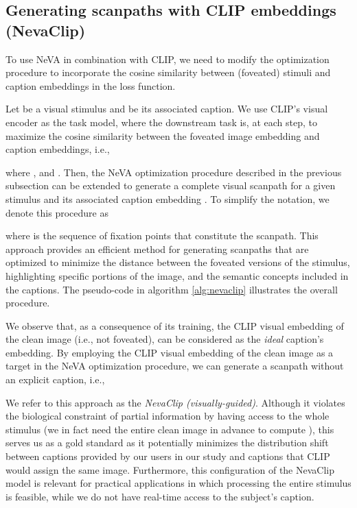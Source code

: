 \documentclass{article}
\begin{document}
\subsection{Generating scanpaths with CLIP embeddings (NevaClip)}
To use NeVA in combination with CLIP, we need to modify the optimization procedure to incorporate the cosine similarity between (foveated) stimuli and caption embeddings in the loss function. 

Let  be a visual stimulus and  be its associated caption. We use CLIP's visual encoder  as the task model, where the downstream task is, at each step, to maximize the cosine similarity between the foveated image embedding and caption embeddings, i.e., 

where , and .
Then, the NeVA optimization procedure described in the previous subsection can be extended to generate a complete visual scanpath for a given stimulus and its associated caption embedding . To simplify the notation, we denote this procedure as 

where  is the sequence of fixation points that constitute the scanpath. This approach provides an efficient method for generating scanpaths that are optimized to minimize the distance between the foveated versions of the stimulus, highlighting specific portions of the image, and the semantic concepts included in the captions. The pseudo-code in algorithm \ref{alg:nevaclip} illustrates the overall procedure.

We observe that, as a consequence of its training, the CLIP visual embedding of the clean image  (i.e., not foveated), can be considered as the \textit{ideal} caption's embedding. By employing the CLIP visual embedding of the clean image as a target in the NeVA optimization procedure, we can generate a scanpath without an explicit caption, i.e., 

We refer to this approach as the  \textit{NevaClip (\textit{visually-guided})}. Although it violates the biological constraint of partial information by having access to the whole stimulus (we in fact need the entire clean image in advance to compute ), this serves us as a gold standard as it potentially minimizes the distribution shift between captions provided by our users in our study and captions that CLIP would assign the same image. Furthermore, this configuration of the NevaClip model is relevant for practical applications in which processing the entire stimulus is feasible, while we do not have real-time access to the subject's caption.
\end{document}
